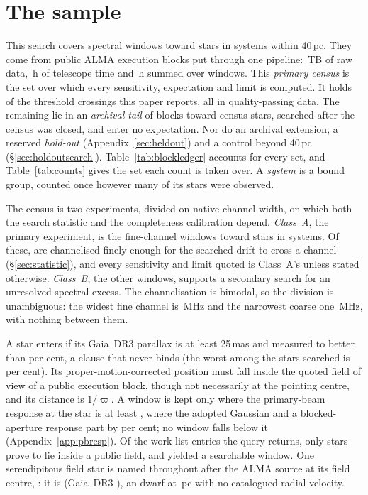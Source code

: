 \section{The sample}
\label{sec:sample}

This search covers \NWindows{} spectral windows toward \NStars{} stars in
\NSystems{} systems within 40\,pc. They come from \NEB{} public ALMA execution
blocks put through one pipeline: \TotalDataTB\,TB of raw data, \StTelHours\,h
of telescope time and \LdgCensusHours\,h summed over windows. This
\emph{primary census} is the set over which every sensitivity, expectation and
limit is computed. It holds \CsNCross{} of the \EvNCrossRaw{} threshold
crossings this paper reports, all in quality-passing data. The remaining \CeNTailCross{}
lie in an \emph{archival tail} of \LdgExtTail{} blocks toward
\LdgTailStars{} census stars, searched after the census was closed, and enter
no expectation. Nor do an archival extension, a reserved \emph{hold-out}
(Appendix~\ref{sec:heldout}) and a control beyond 40\,pc
(\S\ref{sec:holdoutsearch}). Table~\ref{tab:blockledger} accounts for every
set, and Table~\ref{tab:counts} gives the set each count is taken over. A
\emph{system} is a bound group, counted once however many of its stars were
observed.

The census is two experiments, divided on native channel width, on which both
the search statistic and the completeness calibration depend.
\emph{Class~A}, the primary experiment, is the \NWinA{} fine-channel windows
toward \LdgClassAStars{} stars in \NSysClassA{} systems. Of these, \EtaDriftAOk{}
are channelised finely enough for the searched drift to cross a channel
(\S\ref{sec:statistic}), and every sensitivity and limit quoted is Class~A's
unless stated otherwise. \emph{Class~B}, the other \NWinB{} windows, supports a
secondary search for an unresolved spectral excess. The channelisation is
bimodal, so the division is unambiguous: the widest fine channel is
\ScChanFineMaxMHz\,MHz and the narrowest coarse one \ScChanCoarseMinMHz\,MHz,
with nothing between them.

A star enters if its Gaia~DR3 parallax is at least 25\,mas and measured to
better than \PlxAdqlPct{} per cent, a clause that never binds (the worst among
the stars searched is \SfPlxWorstPct{} per cent). Its proper-motion-corrected
position must fall inside the quoted field of view of a public execution
block, though not necessarily at the pointing centre, and its distance is
$1/\varpi$. A window is kept only where the primary-beam response at the star
is at least \BmFloorResp, where the adopted Gaussian and a blocked-aperture
response part by \BmFloorTolPct{} per cent; no window falls below it
(Appendix~\ref{app:pbresp}). Of the \NCensus{} work-list entries the query
returns, only \NGenuinelyCovered{} stars prove to lie inside a public field,
and \NStars{} yielded a searchable window. One serendipitous field star is
named throughout after the ALMA source at its field centre, \BkAlmaName: it is
\BkAlmaTwoMass{} (Gaia~DR3 \BkAlmaGaia), an \BkAlmaSpType{} dwarf at \BkAlmaDistPc\,pc with no
catalogued radial velocity.

